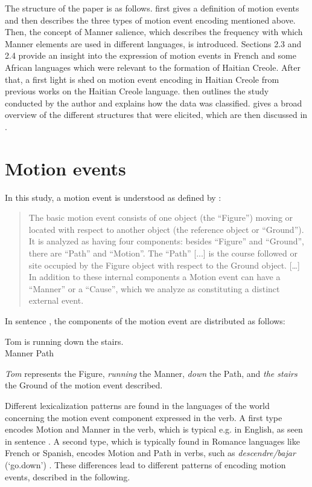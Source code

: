\documentclass[output=paper,colorlinks,citecolor=brown]{langscibook}
\begin{document}
The structure of the paper is as follows.  first gives a definition of motion events and then describes the three types of motion event encoding mentioned above. Then, the concept of Manner salience, which describes the frequency with which Manner elements are used in different languages, is introduced. Sections 2.3 and 2.4 provide an insight into the expression of motion events in French and some African languages which were relevant to the formation of Haitian Creole. After that, a first light is shed on motion event encoding in Haitian Creole from previous works on the Haitian Creole language.  then outlines the study conducted by the author and explains how the data was classified.  gives a broad overview of the different structures that were elicited, which are then discussed in .


\section{Motion events}\label{sec:3:2}

In this study, a motion event is understood as defined by \citet[60--61]{Talmy_1991}:

\begin{quote}
    The basic motion event consists of one object (the “Figure”) moving or located with respect to another object (the reference object or “Ground”). It is analyzed as having four components: besides “Figure” and “Ground”, there are “Path” and “Motion”. The “Path” [...] is the course followed or site occupied by the Figure object with respect to the Ground object. […] In addition to these internal components a Motion event can have a “Manner” or a “Cause”, which we analyze as constituting a distinct external event.
\end{quote}


In sentence , the components of the motion event are distributed as follows:

\ea\label{ex:3:1}
\gll Tom is running {down the stairs}.\\
     {}  {} Manner  Path\\
\z
		
\textit{Tom} represents the Figure, \emph{running} the Manner, \emph{down} the Path, and \emph{the stairs} the Ground of the motion event described.

Different lexicalization patterns are found in the languages of the world concerning the motion event component expressed in the verb. A first type encodes Motion and Manner in the verb, which is typical e.g. in English, as seen in sentence . A second type, which is typically found in Romance languages like French or Spanish, encodes Motion and Path in verbs, such as  \emph{descendre/bajar} (‘go.down’) \citep[62--68]{Talmy_1985}. These differences lead to different patterns of encoding motion events, described in the following.
\end{document}
